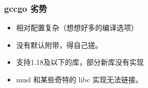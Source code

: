 \documentclass[xcolor=table,dvipsnames,svgnames,aspectratio=169]{ctexbeamer}
\begin{document}
\begin{frame}
  \frametitle{gccgo 劣势}

  \begin{itemize}
    \item 相对配置复杂（想想好多的编译选项）
    \item 没有默认附带，得自己搓。
    \item 支持1.18及以下的库，部分新库没有实现
    \item musl 和某些奇特的 libc 实现无法链接。
  \end{itemize}
  
\end{frame}

\makebottom
\end{document}
